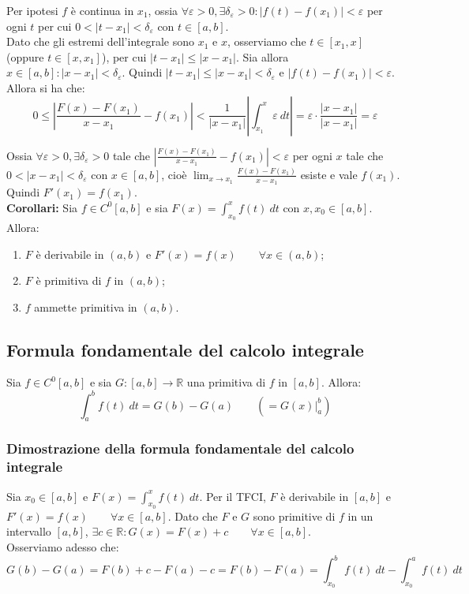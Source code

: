 \documentclass{article}
\begin{document}
\noindent Per ipotesi $f$ è continua in $x_1$, ossia $\forall \varepsilon > 0, \exists \delta_\varepsilon > 0 : |f(t) - f(x_1)| < \varepsilon$ per ogni $t$ per cui $0 < |t - x_1| < \delta_\varepsilon$ con $t \in [a, b]$.\\
Dato che gli estremi dell'integrale sono $x_1$ e $x$, osserviamo che $t \in [x_1, x]$ (oppure $t \in [x, x_1]$), per cui $|t - x_1| \leq |x - x_1|$. Sia allora $x \in [a, b] : |x - x_1| < \delta_\varepsilon$. Quindi $|t - x_1| \leq |x - x_1| < \delta_\varepsilon$ e $|f(t) - f(x_1)| < \varepsilon$. Allora si ha che:
\begin{equation*}
    0 \leq \left|\frac{F(x) - F(x_1)}{x - x_1} - f(x_1)\right| < \frac{1}{|x - x_1|} \left|\int_{x_1}^x \varepsilon \ dt  \right| = \varepsilon \cdot \frac{|x - x_1|}{|x - x_1|} = \varepsilon
\end{equation*}

\noindent Ossia $\forall \varepsilon > 0, \exists \delta_\varepsilon > 0$ tale che $\left|\frac{F(x) - F(x_1)}{x - x_1} - f(x_1)\right| < \varepsilon$ per ogni $x$ tale che $0 < |x - x_1| < \delta_\varepsilon$ con $x \in [a, b]$, cioè $\lim_{x \to x_1} \frac{F(x) - F(x_1)}{x - x_1}$ esiste e vale $f(x_1)$. Quindi $F'(x_1) = f(x_1)$.\\

\noindent\textbf{Corollari:} Sia $f \in C^0[a, b]$ e sia $F(x) = \int_{x_0}^x f(t) \ dt$ con $x, x_0 \in [a, b]$. Allora:
\begin{enumerate}
    \item $F$ è derivabile in $(a, b)$ e $F'(x) = f(x) \qquad \forall x \in (a, b)$;
    \item $F$ è primitiva di $f$ in $(a, b)$;
    \item $f$ ammette primitiva in $(a, b)$.
\end{enumerate}

\subsection{Formula fondamentale del calcolo integrale}
Sia $f \in C^0[a, b]$ e sia $G: [a, b] \xrightarrow{} \mathbb{R}$ una primitiva di $f$ in $[a, b]$. Allora:
\begin{equation*}
    \int_a^b f(t) \ dt = G(b) - G(a) \qquad \left(= G(x) \Big|_a^b\right)
\end{equation*}

\subsubsection{Dimostrazione della formula fondamentale del calcolo integrale}
Sia $x_0 \in [a, b]$ e $F(x) = \int_{x_0}^x f(t) \ dt$. Per il TFCI, $F$ è derivabile in $[a, b]$ e $F'(x) = f(x) \qquad \forall x \in [a, b]$. Dato che $F$ e $G$ sono primitive di $f$ in un intervallo $[a, b]$, $\exists c \in \mathbb{R} : G(x) = F(x) + c \qquad \forall x \in [a, b]$.\\
Osserviamo adesso che:
\begin{equation*}
    G(b) - G(a) = F(b) + c - F(a) - c = F(b) - F(a) = \int_{x_0}^b f(t) \ dt - \int_{x_0}^a f(t) \ dt
\end{equation*}
\end{document}
